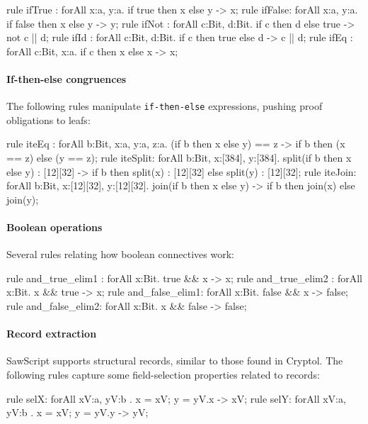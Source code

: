 \documentclass[12pt]{galois-whitepaper}
\newcommand{\sawScript}{{\sc SawScript}\xspace}
\begin{document}
\begin{code}
  rule ifTrue : forAll {x:a, y:a}.     if true  then x else y -> x;
  rule ifFalse: forAll {x:a, y:a}.     if false then x else y -> y;
  rule ifNot  : forAll {c:Bit, d:Bit}. if c then d else true  -> not c || d;
  rule ifId   : forAll {c:Bit, d:Bit}. if c then true else d  -> c || d;
  rule ifEq   : forAll {c:Bit, x:a}.   if c then x else x     -> x;
\end{code}

\paragraph{If-then-else congruences} The following rules manipulate {\tt if-then-else} expressions,
pushing proof obligations to leafs:

\begin{code}
rule iteEq : forAll {b:Bit, x:a, y:a, z:a}.
    (if b then x else y) == z -> if b then (x == z) else (y == z);
rule iteSplit: forAll {b:Bit, x:[384], y:[384]}.
    split(if b then x else y) : [12][32] -> 
       if b then split(x) : [12][32] else split(y) : [12][32];
rule iteJoin: forAll {b:Bit, x:[12][32], y:[12][32]}.
    join(if b then x else y) -> if b then join(x) else join(y);
\end{code}

\paragraph{Boolean operations} Several rules relating how boolean connectives work:
\begin{code}
  rule and_true_elim1 : forAll {x:Bit}. true && x  -> x;
  rule and_true_elim2 : forAll {x:Bit}. x && true  -> x;
  rule and_false_elim1: forAll {x:Bit}. false && x -> false;
  rule and_false_elim2: forAll {x:Bit}. x && false -> false;
\end{code}

\paragraph{Record extraction} \sawScript supports structural records, similar to those found in Cryptol.
The following rules capture some field-selection properties related to records:

\begin{code}
  rule selX: forAll { xV:a, yV:b }. {x = xV; y = yV}.x -> xV;
  rule selY: forAll { xV:a, yV:b }. {x = xV; y = yV}.y -> yV;
\end{code}
\end{document}
